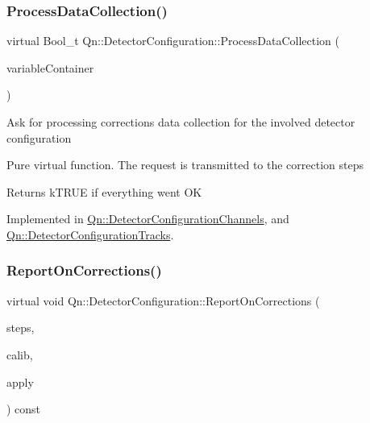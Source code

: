 \subsubsection{\texorpdfstring{Process\+Data\+Collection()}{ProcessDataCollection()}}
{\footnotesize\ttfamily virtual Bool\+\_\+t Qn\+::\+Detector\+Configuration\+::\+Process\+Data\+Collection (\begin{DoxyParamCaption}\item[{const double $\ast$}]{variable\+Container }\end{DoxyParamCaption})\hspace{0.3cm}{\ttfamily [pure virtual]}}

Ask for processing corrections data collection for the involved detector configuration

Pure virtual function. The request is transmitted to the correction steps \begin{DoxyReturn}{Returns}
k\+T\+R\+UE if everything went OK 
\end{DoxyReturn}


Implemented in \mbox{\hyperlink{classQn_1_1DetectorConfigurationChannels_a972f2cc50810d2a9651f2920de5a03ec}{Qn\+::\+Detector\+Configuration\+Channels}}, and \mbox{\hyperlink{classQn_1_1DetectorConfigurationTracks_ab47360b36191cf52c8c9227c3f90fc85}{Qn\+::\+Detector\+Configuration\+Tracks}}.

\mbox{\label{classQn_1_1DetectorConfiguration_ad33e54cbf374fa37d8edf9915719982f}} 
\subsubsection{\texorpdfstring{Report\+On\+Corrections()}{ReportOnCorrections()}}
{\footnotesize\ttfamily virtual void Qn\+::\+Detector\+Configuration\+::\+Report\+On\+Corrections (\begin{DoxyParamCaption}\item[{T\+List $\ast$}]{steps,  }\item[{T\+List $\ast$}]{calib,  }\item[{T\+List $\ast$}]{apply }\end{DoxyParamCaption}) const\hspace{0.3cm}{\ttfamily [pure virtual]}}

